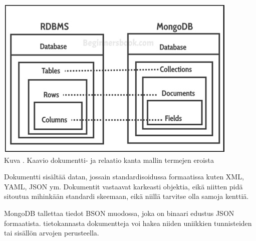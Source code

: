\bigskip
\includegraphics{src/public/oppar/mongodb-structure.jpg} \\
Kuva \getImgCount. Kaavio dokumentti- ja relaatio kanta mallin termejen eroista
\medskip


Dokumentti sisältää datan, jossain standardisoidussa formaatissa kuten XML, YAML, JSON ym.
Dokumentit vastaavat karkeasti objektia, eikä niitten pidä sitoutua mihinkään standardi skeemaan, 
eikä niillä tarvitse olla samoja kenttiä.
\medskip


MongoDB tallettaa tiedot BSON muodossa, joka on binaari edustus JSON formaatista.
tietokannasta dokumentteja voi hakea niiden uniikkien tunnisteiden tai sisällön arvojen perusteella.
\medskip



